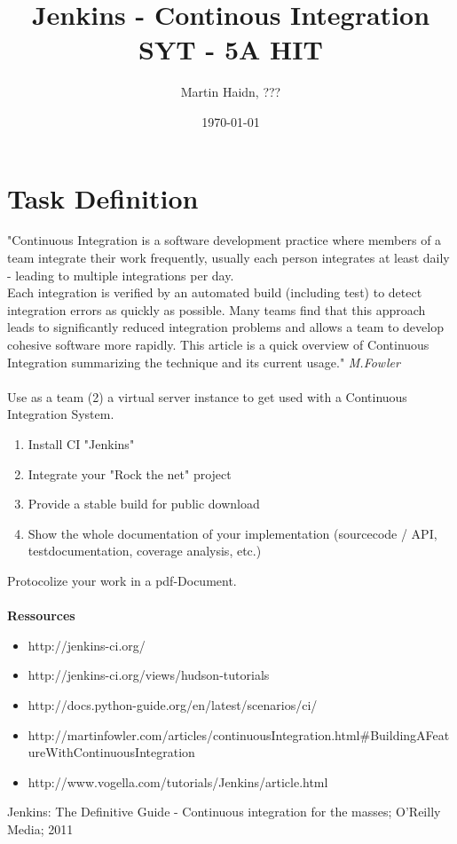 \documentclass[a4paper]{article}
\author{Martin Haidn, ???}
\title{Jenkins - Continous Integration\\SYT - 5A HIT}
\date{\today}
\begin{document}
	\large
	\maketitle
	
	\newpage
	\tableofcontents
	\newpage
	\section{Task Definition}
	"Continuous Integration is a software development practice where members of a team integrate their work frequently, usually each person integrates at least daily - leading to multiple integrations per day.\\
	Each integration is verified by an automated build (including test) to detect integration errors as quickly as possible. Many teams find that this approach leads to significantly reduced integration problems and allows a team to develop cohesive software more rapidly. This article is a quick overview of Continuous Integration summarizing the technique and its current usage." \textit{M.Fowler}\\
	\\
	Use as a team (2) a virtual server instance to get used with a Continuous Integration System.
	\begin{enumerate}
		\item Install CI "Jenkins"
		\item Integrate your "Rock the net" project
		\item Provide a stable build for public download
		\item Show the whole documentation of your implementation (sourcecode / API, testdocumentation, coverage analysis, etc.)
	\end{enumerate}
	Protocolize your work in a pdf-Document.\\
	\\
	\textbf{Ressources}
	\begin{itemize}
		\item http://jenkins-ci.org/
		\item http://jenkins-ci.org/views/hudson-tutorials
		\item http://docs.python-guide.org/en/latest/scenarios/ci/
		\item http://martinfowler.com/articles/continuousIntegration.html\#BuildingAFeatureWithContinuousIntegration
		\item http://www.vogella.com/tutorials/Jenkins/article.html\\
	\end{itemize}
	Jenkins: The Definitive Guide - Continuous integration for the masses; O'Reilly Media; 2011
\end{document}
